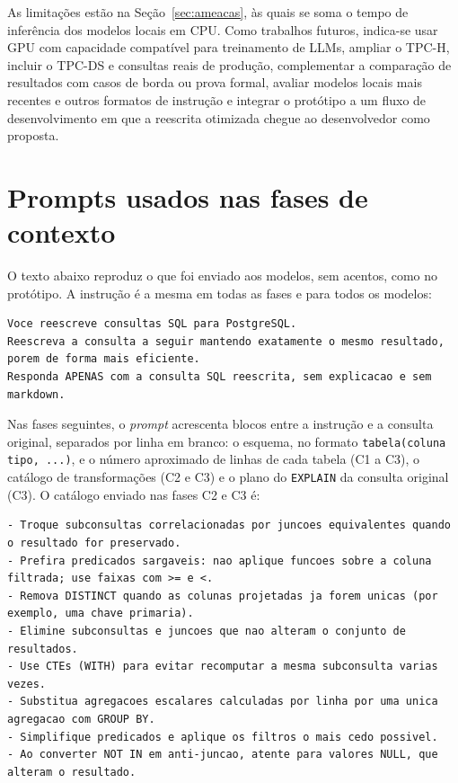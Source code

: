 \documentclass[12pt]{article}
\begin{document}
As limitações estão na Seção~\ref{sec:ameacas}, às quais se soma o tempo de inferência dos modelos locais em CPU. Como trabalhos futuros, indica-se usar GPU com capacidade compatível para treinamento de LLMs, ampliar o TPC-H, incluir o TPC-DS \cite{nambiar2006tpcds} e consultas reais de produção, complementar a comparação de resultados com casos de borda ou prova formal, avaliar modelos locais mais recentes e outros formatos de instrução e integrar o protótipo a um fluxo de desenvolvimento em que a reescrita otimizada chegue ao desenvolvedor como proposta.

\printbibliography  %

\newpage
\appendix
{}
\section{Prompts usados nas fases de contexto}
\label{ap:prompts}

O texto abaixo reproduz o que foi enviado aos modelos, sem acentos, como no protótipo. A instrução é a mesma em todas as fases e para todos os modelos:

\begin{lstlisting}[breaklines=true]
Voce reescreve consultas SQL para PostgreSQL.
Reescreva a consulta a seguir mantendo exatamente o mesmo resultado, porem de forma mais eficiente.
Responda APENAS com a consulta SQL reescrita, sem explicacao e sem markdown.
\end{lstlisting}

Nas fases seguintes, o \textit{prompt} acrescenta blocos entre a instrução e a consulta original, separados por linha em branco: o esquema, no formato \texttt{tabela(coluna tipo, ...)}, e o número aproximado de linhas de cada tabela (C1 a C3), o catálogo de transformações (C2 e C3) e o plano do \texttt{EXPLAIN} da consulta original (C3). O catálogo enviado nas fases C2 e C3 é:

\begin{lstlisting}[breaklines=true]
- Troque subconsultas correlacionadas por juncoes equivalentes quando o resultado for preservado.
- Prefira predicados sargaveis: nao aplique funcoes sobre a coluna filtrada; use faixas com >= e <.
- Remova DISTINCT quando as colunas projetadas ja forem unicas (por exemplo, uma chave primaria).
- Elimine subconsultas e juncoes que nao alteram o conjunto de resultados.
- Use CTEs (WITH) para evitar recomputar a mesma subconsulta varias vezes.
- Substitua agregacoes escalares calculadas por linha por uma unica agregacao com GROUP BY.
- Simplifique predicados e aplique os filtros o mais cedo possivel.
- Ao converter NOT IN em anti-juncao, atente para valores NULL, que alteram o resultado.
\end{lstlisting}
\end{document}
